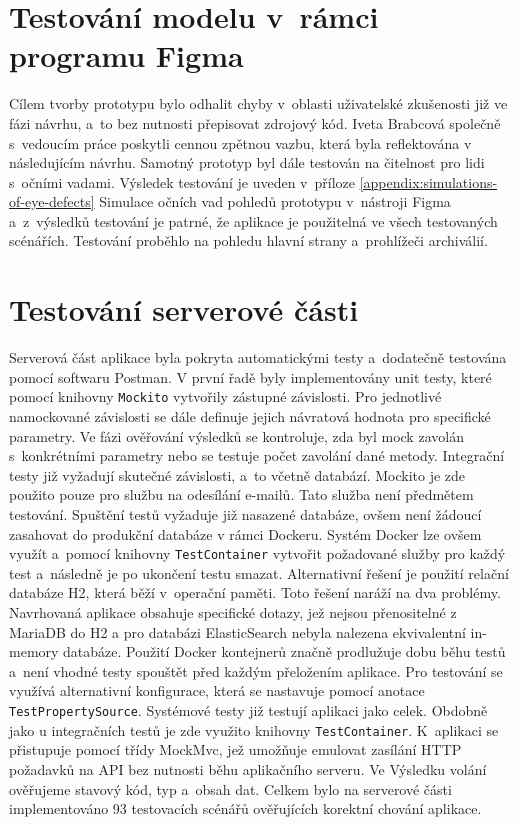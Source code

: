 \section{Testování modelu v~rámci programu Figma}
Cílem tvorby prototypu bylo odhalit chyby v~oblasti uživatelské zkušenosti již ve fázi návrhu, a~to bez nutnosti přepisovat zdrojový kód. Iveta Brabcová společně s~vedoucím práce poskytli cennou zpětnou vazbu, která byla reflektována v následujícím návrhu.
\newpara
Samotný prototyp byl dále testován na čitelnost pro lidi s~očními vadami. Výsledek testování je uveden v~příloze \ref{appendix:simulations-of-eye-defects} Simulace očních vad pohledů prototypu v~nástroji Figma a~z~výsledků testování je patrné, že aplikace je použitelná ve všech testovaných scénářích. Testování proběhlo na pohledu hlavní strany a~prohlížeči archiválií.

\section{Testování serverové části}
Serverová část aplikace byla pokryta automatickými testy a~dodatečně testována pomocí softwaru Postman.
\newpara
V první řadě byly implementovány unit testy, které pomocí knihovny \texttt{Mockito} vytvořily zástupné závislosti. Pro jednotlivé namockované závislosti se dále definuje jejich návratová hodnota pro specifické parametry. Ve fázi ověřování výsledků se kontroluje, zda byl mock zavolán s~konkrétními parametry nebo se testuje počet zavolání dané metody.
\newpara
Integrační testy již vyžadují skutečné závislosti, a~to včetně databází. Mockito je zde použito pouze pro službu na odesílání e-mailů. Tato služba není předmětem testování. Spuštění testů vyžaduje již nasazené databáze, ovšem není žádoucí zasahovat do produkční databáze v rámci Dockeru. Systém Docker lze ovšem využít a~pomocí knihovny \texttt{TestContainer} vytvořit požadované služby pro každý test a~následně je po ukončení testu smazat. Alternativní řešení je použití relační databáze H2, která běží v~operační paměti. Toto řešení naráží na dva problémy. Navrhovaná aplikace obsahuje specifické dotazy, jež nejsou přenositelné z MariaDB do H2 a pro databázi ElasticSearch nebyla nalezena ekvivalentní in-memory databáze. Použití Docker kontejnerů značně prodlužuje dobu běhu testů a~není vhodné testy spouštět před každým přeložením aplikace. Pro testování se využívá alternativní konfigurace, která se nastavuje pomocí anotace \texttt{TestPropertySource}.
\newpara
Systémové testy již testují aplikaci jako celek. Obdobně jako u integračních testů je zde využito knihovny \texttt{TestContainer}. K~aplikaci se přistupuje pomocí třídy MockMvc, jež umožňuje emulovat zasílání HTTP požadavků na API bez nutnosti běhu aplikačního serveru. Ve Výsledku volání ověřujeme stavový kód, typ a~obsah dat. 
\newpage
\noindent
Celkem bylo na serverové části implementováno 93 testovacích scénářů ověřujících korektní chování aplikace.

